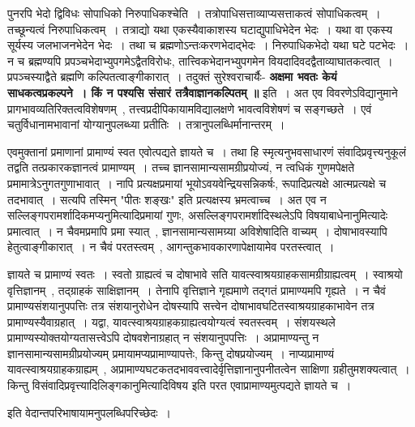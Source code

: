 	पुनरपि भेदो द्विविधः सोपाधिको निरुपाधिकश्चेति~। तत्रोपाधिसत्ताव्याप्यसत्ताकत्वं सोपाधिकत्वम्~। तच्छून्यत्वं निरुपाधिकत्वम्~। तत्राद्यो यथा एकस्यैवाकाशस्य घटाद्युपाधिभेदेन भेदः~। यथा वा एकस्य सूर्यस्य जलभाजनभेदेन भेदः~। तथा च ब्रह्मणोऽन्तःकरणभेदाद्भेदः~। निरुपाधिकभेदो यथा घटे पटभेदः~। न च ब्रह्मण्यपि प्रपञ्चभेदाभ्युपगमेऽद्वैतविरोधः, तात्त्विकभेदानभ्युपगमेन वियदादिवदद्वैताव्याघातकत्वात्~। प्रपञ्चस्याद्वैते ब्रह्मणि कल्पितत्वाङ्गीकारात्~। तदुक्तं सुरेश्वराचार्यैः- {\bfseries अक्षमा भवतः केयं साधकत्वप्रकल्पने~। किं न पश्यसि संसारं तत्रैवाज्ञानकल्पितम् ॥} इति~। अत एव विवरणेऽविद्यानुमाने प्रागभावव्यतिरिक्तत्वविशेषणम्~, तत्त्वप्रदीपिकायामविद्यालक्षणे भावत्वविशेषणं च सङ्गच्छते~।
	एवं चतुर्विधानामभावानां योग्यानुपलब्ध्या प्रतीतिः~। तत्रानुपलब्धिर्मानान्तरम्~।\par
	एवमुक्तानां प्रमाणानां प्रामाण्यं स्वत एवोत्पद्यते ज्ञायते च~। तथा हि स्मृत्यनुभवसाधारणं संवादिप्रवृत्त्यनुकूलं तद्वति तत्प्रकारकज्ञानत्वं प्रामाण्यम्~। तच्च ज्ञानसामान्यसामग्रीप्रयोज्यं, न त्वधिकं गुणमपेक्षते प्रमामात्रेऽनुगतगुणाभावात्~। नापि प्रत्यक्षप्रमायां भूयोऽवयवेन्द्रियसन्निकर्षः, रूपादिप्रत्यक्षे आत्मप्रत्यक्षे च तदभावात्~। सत्यपि तस्मिन् "पीतः शङ्खः" इति प्रत्यक्षस्य भ्रमत्वाच्च~। अत एव न सल्लिङ्गपरामर्शादिकमप्यनुमित्यादिप्रमायां गुणः, असल्लिङ्गपरामर्शादिस्थलेऽपि विषयाबाधेनानुमित्यादेः प्रमात्वात्~। न चैवमप्रमापि प्रमा स्यात्~, ज्ञानसामान्यसामग्र्या अविशेषादिति वाच्यम्~। दोषाभावस्यापि हेतुत्वाङ्गीकारात्~। न चैवं परतस्त्वम्~, आगन्तुकभावकारणापेक्षायामेव परतस्त्वात्~।\par
	ज्ञायते च प्रामाण्यं स्वतः~। स्वतो ग्राह्यत्वं च दोषाभावे सति यावत्स्वाश्रयग्राहकसामग्रीग्राह्यत्वम्~। स्वाश्रयो वृत्तिज्ञानम्~, तद्ग्राहकं साक्षिज्ञानम्~। तेनापि वृत्तिज्ञाने गृह्यमाणे तद्गतं प्रामाण्यमपि गृह्यते~। न चैवं प्रामाण्यसंशयानुपपत्तिः तत्र संशयानुरोधेन दोषस्यापि सत्त्वेन दोषाभावघटितस्वाश्रयग्राहकाभावेन तत्र प्रामाण्यस्यैवाग्रहात्~। यद्वा, यावत्स्वाश्रयग्राहकग्राह्यत्वयोग्यत्वं स्वतस्त्वम्~। संशयस्थले प्रामाण्यस्योक्तयोग्यतासत्त्वेऽपि दोषवशेनाग्रहात् न संशयानुपपत्तिः~।
	अप्रामाण्यन्तु न ज्ञानसामान्यसामग्रीप्रयोज्यम् प्रमायामप्यप्रामाण्यापत्तेः, किन्तु दोषप्रयोज्यम्~। नाप्यप्रामाण्यं यावत्स्वाश्रयग्राहकग्राह्यम्~, अप्रामाण्यघटकतदभाववत्त्वादेर्वृत्तिज्ञानानुपनीतत्वेन साक्षिणा ग्रहीतुमशक्यत्वात्~। किन्तु विसंवादिप्रवृत्त्यादिलिङ्गकानुमित्यादिविषय इति परत एवाप्रामाण्यमुत्पद्यते ज्ञायते च~।\\
	\begin{center} इति वेदान्तपरिभाषायामनुपलब्धिपरिच्छेदः~।\end{center} 
